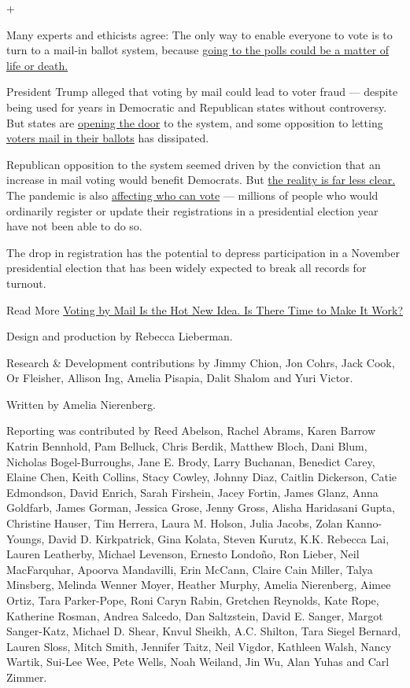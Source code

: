 +

Many experts and ethicists agree: The only way to enable everyone to
vote is to turn to a mail-in ballot system, because
\href{https://www.nytimes.com/2020/05/05/magazine/voting-by-mail-2020-covid.html}{going
to the polls could be a matter of life or death.}

President Trump alleged that voting by mail could lead to voter fraud
--- despite being used for years in Democratic and Republican states
without controversy. But states are
\href{https://www.nytimes.com/2020/05/21/us/vote-by-mail-trump.html}{opening
the door} to the system, and some opposition to letting
\href{https://www.nytimes.com/2020/06/10/us/politics/voting-by-mail-georgia.html}{voters
mail in their ballots} has dissipated.

Republican opposition to the system seemed driven by the conviction that
an increase in mail voting would benefit Democrats. But
\href{https://www.nytimes.com/2020/05/25/us/vote-by-mail-coronavirus.html}{the
reality is far less clear.} The pandemic is also
\href{https://www.nytimes.com/2020/06/14/us/voter-registration-coronavirus-2020-election.html}{affecting
who can vote} --- millions of people who would ordinarily register or
update their registrations in a presidential election year have not been
able to do so.

The drop in registration has the potential to depress participation in a
November presidential election that has been widely expected to break
all records for turnout.

 Read More
\href{https://www.nytimes.com/2020/03/19/us/politics/voting-by-mail-coronavirus.html}{Voting
by Mail Is the Hot New Idea. Is There Time to Make It Work?}

Design and production by Rebecca Lieberman.

Research \& Development contributions by Jimmy Chion, Jon Cohrs, Jack
Cook, Or Fleisher, Allison Ing, Amelia Pisapia, Dalit Shalom and Yuri
Victor.

Written by Amelia Nierenberg.

Reporting was contributed by Reed Abelson, Rachel Abrams, Karen Barrow
Katrin Bennhold, Pam Belluck, Chris Berdik, Matthew Bloch, Dani Blum,
Nicholas Bogel-Burroughs, Jane E. Brody, Larry Buchanan, Benedict Carey,
Elaine Chen, Keith Collins, Stacy Cowley, Johnny Diaz, Caitlin
Dickerson, Catie Edmondson, David Enrich, Sarah Firshein, Jacey Fortin,
James Glanz, Anna Goldfarb, James Gorman, Jessica Grose, Jenny Gross,
Alisha Haridasani Gupta, Christine Hauser, Tim Herrera, Laura M. Holson,
Julia Jacobs, Zolan Kanno-Youngs, David D. Kirkpatrick, Gina Kolata,
Steven Kurutz, K.K. Rebecca Lai, Lauren Leatherby, Michael Levenson,
Ernesto Londoño, Ron Lieber, Neil MacFarquhar, Apoorva Mandavilli, Erin
McCann, Claire Cain Miller, Talya Minsberg, Melinda Wenner Moyer,
Heather Murphy, Amelia Nierenberg, Aimee Ortiz, Tara Parker-Pope, Roni
Caryn Rabin, Gretchen Reynolds, Kate Rope, Katherine Rosman, Andrea
Salcedo, Dan Saltzstein, David E. Sanger, Margot Sanger-Katz, Michael D.
Shear, Knvul Sheikh, A.C. Shilton, Tara Siegel Bernard, Lauren Sloss,
Mitch Smith, Jennifer Taitz, Neil Vigdor, Kathleen Walsh, Nancy Wartik,
Sui-Lee Wee, Pete Wells, Noah Weiland, Jin Wu, Alan Yuhas and Carl
Zimmer.


